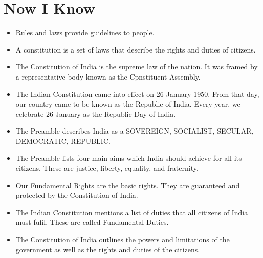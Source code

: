 \section{Now I Know}
\begin{itemize}
    \item Rules and laws provide guidelines to people.
    \item A constitution is a set of laws that describe the rights and duties of citizens.
    \item The Constitution of India is the supreme law of the nation. It was framed by a representative body known as the Cpnstituent Assembly.
    \item The Indian Constitution came into effect on 26 January 1950. From that day, our country came to be known as the Republic of India. Every year, we celebrate 26 January as the Republic Day of India.
    \item The Preamble describes India as a SOVEREIGN, SOCIALIST, SECULAR, DEMOCRATIC, REPUBLIC.
    \item The Preamble lists four main aims which India should achieve for all its citizens. These are justice, liberty, equality, and fraternity.
    \item Our Fundamental Rights are the basic rights. They are guaranteed and protected by the Constitution of India.
    \item The Indian Constitution mentions a list of duties that all citizens of India must fufil. These are called Fundamental Duties.
    \item The Constitution of India outlines the powers and limitations of the government as well as the rights and duties of the citizens.
\end{itemize}